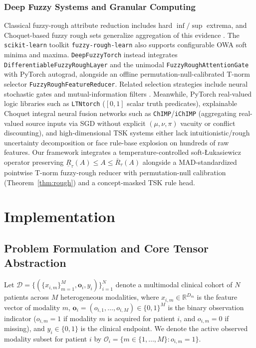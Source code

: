 \documentclass[10pt,twocolumn]{article}
\begin{document}
\subsubsection{Deep Fuzzy Systems and Granular Computing}
Classical fuzzy-rough attribute reduction
\cite{dubois1990rough,jensen2004fuzzy,cornelis2010attribute} includes hard $\inf/\sup$
extrema, and Choquet-based fuzzy rough sets generalize aggregation of this evidence
\cite{theerens2022choquet}. The \texttt{scikit-learn} toolkit \texttt{fuzzy-rough-learn}
\cite{lenz2022fuzzyroughlearn} also supports configurable OWA soft minima and maxima.
\texttt{DeepFuzzyTorch} instead integrates \texttt{DifferentiableFuzzyRoughLayer} and the
unimodal \texttt{FuzzyRoughAttentionGate} with PyTorch autograd, alongside an offline
permutation-null-calibrated T-norm selector \texttt{FuzzyRoughFeatureReducer}. Related
selection strategies include neural stochastic gates \cite{yamada2020feature} and
mutual-information filters \cite{peng2005feature}. Meanwhile, PyTorch real-valued logic
libraries such as
\texttt{LTNtorch} \cite{badreddine2022ltntorch} ($[0,1]$ scalar truth predicates), explainable
Choquet integral neural fusion networks such as \texttt{ChIMP}/\texttt{iChIMP}
\cite{islam2020chimp} (aggregating real-valued source inputs via SGD without explicit
$(\mu,\nu,\pi)$ vacuity or conflict discounting), and high-dimensional TSK systems
\cite{jang1993anfis,wu2020optimize,cui2021curse} either lack intuitionistic/rough uncertainty
decomposition or face rule-base explosion on hundreds of raw features. Our framework integrates
a temperature-controlled soft-{\L}ukasiewicz operator preserving $\underline{R}_\tau(A) \le A
\le \overline{R}_\tau(A)$ alongside a MAD-standardized pointwise T-norm fuzzy-rough reducer
with permutation-null calibration (Theorem~\ref{thm:rough}) and a concept-masked TSK rule head.

\section{Implementation}
\label{sec:method}

\subsection{Problem Formulation and Core Tensor Abstraction}
\label{sec:design_principles}

Let $\mathcal{D} = \{(\{x_{i,m}\}_{m=1}^M, \bm{o}_i, y_i)\}_{i=1}^N$ denote a multimodal
clinical cohort of $N$ patients across $M$ heterogeneous modalities, where $x_{i,m} \in
\mathbb{R}^{D_m}$ is the feature vector of modality $m$, $\bm{o}_i = (o_{i,1},\dots,o_{i,M})
\in \{0,1\}^M$ is the binary observation indicator ($o_{i,m}=1$ if modality $m$ is acquired for
patient $i$, and $o_{i,m}=0$ if missing), and $y_i \in \{0,1\}$ is the clinical endpoint. We
denote the active observed modality subset for patient $i$ by $\mathcal{O}_i = \{m \in
\{1,\dots,M\} : o_{i,m}=1\}$.
\end{document}
